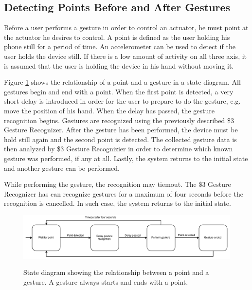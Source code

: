 \subsection{Detecting Points Before and After Gestures}

Before a user performs a gesture in order to control an actuator, he must point at the actuator he desires to control. A point is defined as the user holding his phone still for a period of time. An accelerometer can be used to detect if the user holds the device still. If there is a low amount of activity on all three axis, it is assumed that the user is holding the device in his hand without moving it.

Figure \ref{fig:gesture-recognition:point-to-gesture-state-diagram} shows the relationship of a point and a gesture in a state diagram. All gestures begin and end with a point. When the first point is detected, a very short delay is introduced in order for the user to prepare to do the gesture, e.g. move the position of his hand. When the delay has passed, the gesture recognition begins. Gestures are recognized using the previously described \$3 Gesture Recognizer. After the gesture has been performed, the device must be hold still again and the second point is detected. The collected gesture data is then analyzed by \$3 Gesture Recognizier in order to determine which known gesture was performed, if any at all. Lastly, the system returns to the initial state and another gesture can be performed.

While performing the gesture, the recognition may tiemout. The \$3 Gesture Recognizer has can recognize gestures for a maximum of four seconds before the recognition is cancelled. In such case, the system returns to the initial state.

\begin{figure}[h]
\centering
\includegraphics[width=\textwidth]{images/point-to-gesture-state-diagram}
\label{fig:gesture-recognition:point-to-gesture-state-diagram}
\caption{State diagram showing the relationship between a point and a gesture. A gesture always starts and ends with a point.}
\end{figure}


